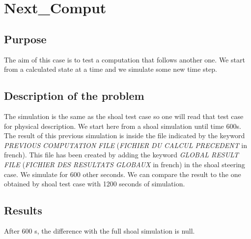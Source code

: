 \section{Next\_Comput}

\subsection{Purpose}
%
The aim of this case is to test a computation that follows another one. We start from a calculated state at a time and we simulate some new time step.
%
\subsection{Description of the problem}
%
The simulation is the same as the shoal test case so one will read that test case for physical description. We start here from a shoal simulation until time 600s. The result of this previous simulation is inside the file indicated by the keyword {\it PREVIOUS COMPUTATION FILE} ({\it FICHIER DU CALCUL PRECEDENT} in french). This file has been created by adding the keyword  {\it GLOBAL RESULT FILE} ({\it FICHIER DES RESULTATS GLOBAUX} in french) in the shoal steering case.
We simulate for 600 other seconds. We can compare the result to the one obtained by shoal test case with 1200 seconds of simulation.

\subsection{Results}
After 600 s, the difference with the full shoal simulation is null.